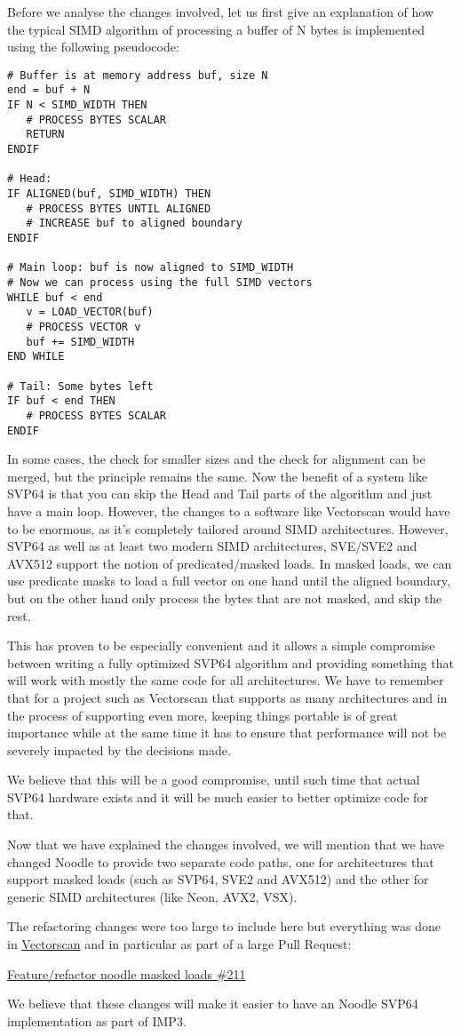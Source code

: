 Before we analyse the changes involved, let us first give an explanation of how the typical SIMD algorithm of processing a buffer of N bytes is implemented using the following pseudocode:

\begin{verbatim}
# Buffer is at memory address buf, size N
end = buf + N
IF N < SIMD_WIDTH THEN
   # PROCESS BYTES SCALAR
   RETURN
ENDIF

# Head:
IF ALIGNED(buf, SIMD_WIDTH) THEN
   # PROCESS BYTES UNTIL ALIGNED
   # INCREASE buf to aligned boundary
ENDIF

# Main loop: buf is now aligned to SIMD_WIDTH
# Now we can process using the full SIMD vectors
WHILE buf < end
   v = LOAD_VECTOR(buf)
   # PROCESS VECTOR v
   buf += SIMD_WIDTH
END WHILE

# Tail: Some bytes left
IF buf < end THEN
   # PROCESS BYTES SCALAR
ENDIF
\end{verbatim}

In some cases, the check for smaller sizes and the check for alignment can be merged, but the principle remains the same.
Now the benefit of a system like SVP64 is that you can skip the Head and Tail parts of the algorithm and just have a main loop.
However, the changes to a software like Vectorscan would have to be enormous, as it's completely tailored around SIMD architectures.
However, SVP64 as well as at least two modern SIMD architectures, SVE/SVE2 and AVX512 support the notion of predicated/masked loads.
In masked loads, we can use predicate masks to load a full vector on one hand until the aligned boundary, but on the other hand only process the bytes that are not masked, and skip the rest.

This has proven to be especially convenient and it allows a simple compromise between writing a fully optimized SVP64 algorithm and providing something that will work with mostly the same code for all architectures.
We have to remember that for a project such as Vectorscan that supports as many architectures and in the process of supporting even more, keeping things portable is of great importance while at the same time it has to ensure that performance will not be severely impacted by the decisions made.

We believe that this will be a good compromise, until such time that actual SVP64 hardware exists and it will be much easier to better optimize code for that.

Now that we have explained the changes involved, we will mention that we have changed Noodle to provide two separate code paths, one for architectures that support masked loads (such as SVP64, SVE2 and AVX512) and the other for generic SIMD architectures (like Neon, AVX2, VSX).

The refactoring changes were too large to include here but everything was done in \href{https://github.com/VectorCamp/vectorscan}{Vectorscan} and in particular as part of a large Pull Request:

\href{https://github.com/VectorCamp/vectorscan/pull/211}{Feature/refactor noodle masked loads \#211}

We believe that these changes will make it easier to have an Noodle SVP64 implementation as part of IMP3.
